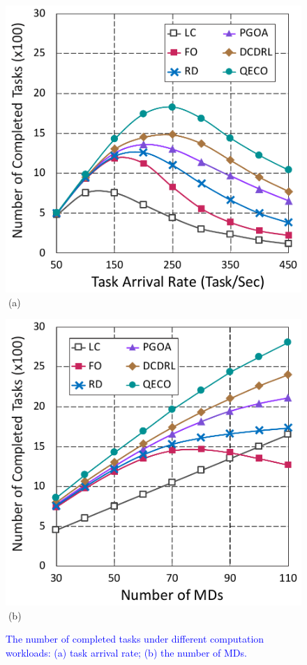 \documentclass[10pt, journal,letterpaper]{IEEEtran}
\begin{document}
\begin{figure}[tbp]
\captionsetup{name=Fig.}
\begin{minipage}[b]{0.5\linewidth}
	\centering
	\includegraphics[width=\textwidth]{ drop_1} 
	\textcolor{white}{i}\hspace{0.6cm}(a)
\end{minipage}
\hspace{-0.2cm}
\begin{minipage}[b]{0.5\linewidth}
	\centering
	\includegraphics[width=\textwidth]{ drop_2}
	\textcolor{white}{i}\hspace{0.6cm}(b)
\end{minipage}
\vspace{-0.65cm}
\caption{\textcolor{blue}{The number of completed tasks under different computation workloads: (a) task arrival rate; (b) the number of MDs.}}
\label{chart1}
\end{figure}
\end{document}
